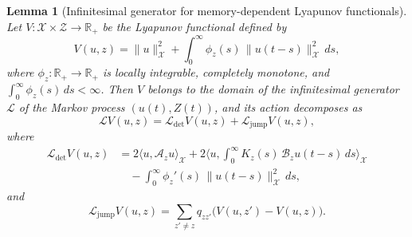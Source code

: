 \documentclass[10pt,a4paper]{amsart}
\newtheorem{lemma}{Lemma}
\begin{document}
	\begin{lemma}[Infinitesimal generator for memory-dependent Lyapunov functionals]
		\label{app:lem:generator}
		Let $V:\mathcal{X}\times\mathcal{Z}\to\mathbb{R}_+$ be the Lyapunov functional
		defined by
		\begin{equation}
			\label{app:eq:Lyap-memory}
			V(u,z)
			=
			\|u\|_{\mathcal{X}}^2
			+
			\int_0^\infty \phi_z(s)\,\|u(t-s)\|_{\mathcal{X}}^2\,ds,
		\end{equation}
		where $\phi_z:\mathbb{R}_+\to\mathbb{R}_+$ is locally integrable, completely
		monotone, and $\int_0^\infty \phi_z(s)\,ds<\infty$.
		Then $V$ belongs to the domain of the infinitesimal generator $\mathcal{L}$ of
		the Markov process $(u(t),Z(t))$, and its action decomposes as
		\begin{equation}
			\label{app:eq:generator-decomposition}
			\mathcal{L}V(u,z)
			=
			\mathcal{L}_{\mathrm{det}}V(u,z)
			+
			\mathcal{L}_{\mathrm{jump}}V(u,z),
		\end{equation}
		where
		\begin{align}
			\label{app:eq:generator-det}
			\mathcal{L}_{\mathrm{det}}V(u,z)
			&=
			2\langle u,\mathcal{A}_z u\rangle_{\mathcal{X}}
			+
			2\Big\langle
			u,
			\int_0^\infty K_z(s)\,\mathcal{B}_z u(t-s)\,ds
			\Big\rangle_{\mathcal{X}}
			\nonumber\\
			&\quad
			-
			\int_0^\infty \phi_z'(s)\,\|u(t-s)\|_{\mathcal{X}}^2\,ds,
		\end{align}
		and
		\begin{equation}
			\label{app:eq:generator-jump}
			\mathcal{L}_{\mathrm{jump}}V(u,z)
			=
			\sum_{z'\neq z} q_{zz'}\big(V(u,z')-V(u,z)\big).
		\end{equation}
	\end{lemma}
\end{document}
